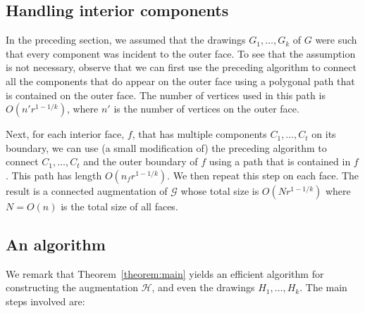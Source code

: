 \documentclass[11pt]{patmorin}
\begin{document}
\subsection{Handling interior components}

In the preceding section, we assumed that the drawings $G_1,\ldots,G_k$ of $G$ were such that every component was incident to the outer face.
To see that the assumption is not necessary, observe that we can first use the preceding algorithm to connect all the components that do appear on the outer face using a polygonal path that is contained on the outer face.  The number of vertices used in this path is $O(n'r^{1-1/k})$, where $n'$ is the number of vertices on the outer face.

Next, for each interior face, $f$, that has multiple components
$C_1,\ldots,C_t$ on its boundary, we can use (a small modification of)
the preceding algorithm to connect $C_1,\ldots,C_t$ and the outer
boundary of $f$ using a path that is contained in $f$.  This path
has length $O(n_fr^{1-1/k})$.  We then repeat this step on each face.
The result is a connected augmentation of $\mathcal G$ whose total size
is $O(Nr^{1-1/k})$ where $N=O(n)$ is the total size of all faces.

\subsection{An algorithm}


We remark that Theorem~\ref{theorem:main} yields an efficient algorithm for constructing the augmentation $\mathcal{H}$, and even the drawings $H_1,\ldots,H_k$.  The main steps involved are: 
\end{document}
